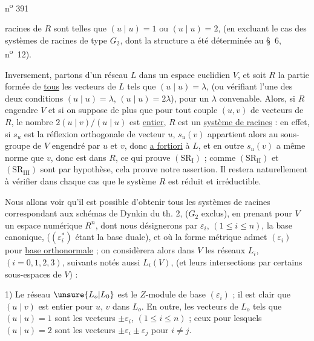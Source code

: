 \hfill n\textsuperscript{o} 391

racines de $R$ sont telles que $(u\mid u)=1$ ou $(u\mid u)=2$, (en excluant le cas des systèmes de racines de type $G_2$, dont la structure a été déterminée au \S~6, n\textsuperscript{o}~12).

Inversement, partons d'un réseau $L$ dans un espace euclidien $V$, et soit $R$ la partie formée de \uline{tous} les vecteurs de $L$ tels que $(u\mid u)=\lambda$, (ou vérifiant l'une des deux conditions $(u\mid u)=\lambda$, $(u\mid u)=2\lambda$), pour un $\lambda$ convenable. Alors, si $R$ engendre $V$ et si on suppose de plus que pour tout couple $(u,v)$ de vecteurs de $R$, le nombre $2(u\mid v)/(u\mid u)$ est \uline{entier}, $R$ est un \uline{système de racines} : en effet, si $s_u$ est la réflexion orthogonale de vecteur $u$, $s_u(v)$ appartient alors au sous-groupe de $V$ engendré par $u$ et $v$, donc \uline{a fortiori} à $L$, et en outre $s_u(v)$ a même norme que $v$, donc est dans $R$, ce qui prouve $(\mathrm{SR}_{\mathrm I})$ ; comme $(\mathrm{SR}_{\mathrm{II}})$ et $(\mathrm{SR}_{\mathrm{III}})$ sont  par hypothèse, cela prouve notre assertion. Il restera naturellement à vérifier dans chaque cas que le système $R$ est réduit et irréductible.

Nous allons voir qu'il est possible d'obtenir tous les systèmes de racines correspondant aux schémas de Dynkin du th. 2, ($G_2$ exclus), en prenant pour $V$ un espace numérique $R^n$, dont nous désignerons par $\varepsilon_i$, $(1\leq i\leq n)$, la base canonique, ($(\varepsilon_i^*)$ étant la base duale), et où la forme métrique admet $(\varepsilon_i)$ pour \uline{base orthonormale} ; on considèrera alors dans $V$ les réseaux $L_i$, $(i=0,1,2,3)$, suivants notés aussi $L_i(V)$, (et leurs intersections par certains sous-espaces de $V$) :

1) Le réseau $\unsure{L_o|L_0}$ est le $Z$-module de base $(\varepsilon_i)$ ; il est clair que $(u\mid v)$ est entier pour $u$, $v$ dans $L_o$. En outre, les vecteurs de $L_o$ tels que $(u\mid u)=1$ sont les vecteurs $\pm\varepsilon_i$, $(1\leq i\leq n)$ ; ceux pour lesquels $(u\mid u)=2$ sont les vecteurs $\pm\varepsilon_i\pm\varepsilon_j$ pour $i\neq j$.

